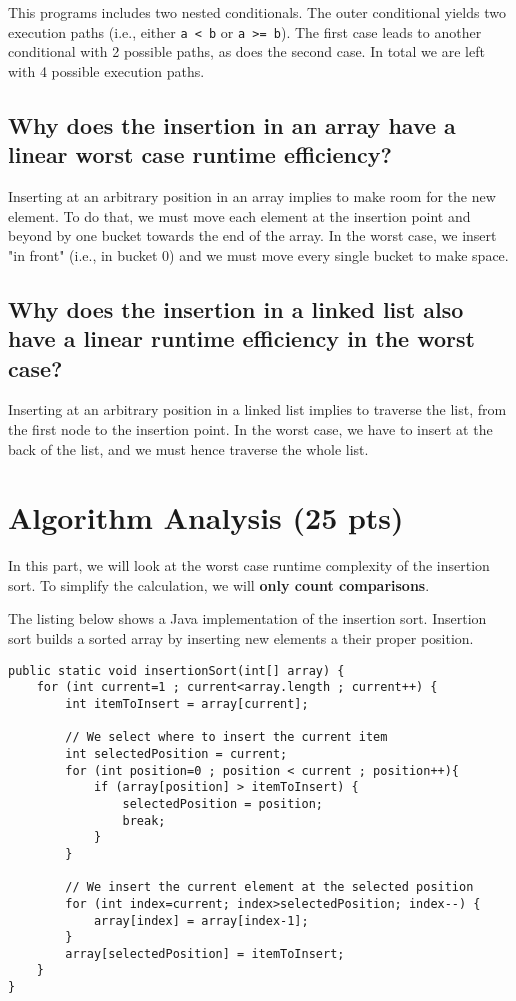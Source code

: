 \documentclass[11pt]{article}
\begin{document}
This programs includes two nested conditionals. The outer
conditional yields two execution paths (i.e., either \texttt{a < b} or
\texttt{a >= b}). The first case leads to another conditional with 2
possible paths, as does the second case. In total we are left
with 4 possible execution paths.

\subsection{Why does the insertion in an array have a linear worst case runtime efficiency?}
\label{sec:org4935067}

Inserting at an arbitrary position in an array implies to make room
for the new element. To do that, we must move each element at the
insertion point and beyond by one bucket towards the end of the
array. In the worst case, we insert "in front" (i.e., in bucket 0)
and we must move every single bucket to make space.

\subsection{Why does the insertion in a linked list also have a linear runtime efficiency in the worst case?}
\label{sec:orgdcc5d7e}

Inserting at an arbitrary position in a linked list implies to
traverse the list, from the first node to the insertion point. In
the worst case, we have to insert at the back of the list, and we
must hence traverse the whole list.

\section{Algorithm Analysis (25 pts)}
\label{sec:org7e929c7}

In this part, we will look at the worst case runtime complexity of
the insertion sort. To simplify the calculation, we will \textbf{only count
comparisons}.

The listing below shows a Java implementation of the insertion
sort. Insertion sort builds a sorted array by inserting new elements
a their proper position.

\begin{verbatim}
public static void insertionSort(int[] array) {
    for (int current=1 ; current<array.length ; current++) {
        int itemToInsert = array[current];

        // We select where to insert the current item
        int selectedPosition = current;
        for (int position=0 ; position < current ; position++){
            if (array[position] > itemToInsert) {
                selectedPosition = position;
                break;
            }
        }

        // We insert the current element at the selected position
        for (int index=current; index>selectedPosition; index--) {
            array[index] = array[index-1];
        }
        array[selectedPosition] = itemToInsert;
    }
}
\end{verbatim}
\end{document}
